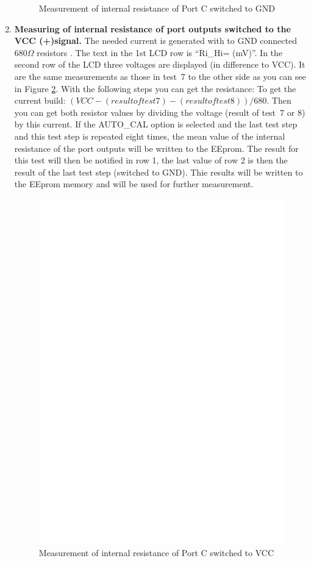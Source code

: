 \begin{enumerate}
\begin{figure}[H]
\caption{Measurement of internal resistance of Port C switched to GND }
\label{fig:test7}
\end{figure}

\item {\bf Measuring of internal resistance of port outputs switched to the VCC (+)signal.}
The needed current is generated with to GND connected \(680\Omega\) resistors .
The text in the 1st LCD row is ``Ri\_Hi= (mV)''. In the second row of the LCD three voltages are displayed (in difference to VCC).
It are the same measurements as those in test~7 to the other side as you can see in Figure \ref{fig:test8}.
With the following steps you can get the resistance:
To get the current build:  \((VCC - (result of test 7) - (result of test 8)) / 680\).
Then you can get both resistor values by dividing the voltage (result of test~7 or 8) by this current.
If the AUTO\_CAL option is selected and the last test step and this test step is repeated eight times, the
mean value of the internal resistance of the port outputs will be written to the EEprom.
The result for this test will then be notified in row 1, the last value of row 2 is then the result of
the last test step (switched to GND).
Thie results will be written to the EEprom memory and will be used for further measurement.

\begin{figure}[H]
\centering
\includegraphics[]{../FIG/Test8.eps}
\caption{Measurement of internal resistance of Port C switched to VCC }
\label{fig:test8}
\end{figure}


\end{enumerate}
